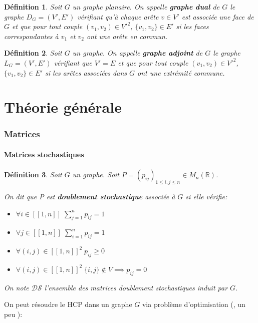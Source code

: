 \documentclass{article}
\newtheorem{definition}{Définition}[section]
\begin{document}
\begin{definition}
Soit $G$ un graphe planaire. On appelle \textbf{graphe dual} de $G$ le graphe $D_{G}=(V',E')$ vérifiant qu'à chaque arête $v \in V'$ est associée une face de $G$ et que pour tout couple $(v_{1},v_{2}) \in V'^{2}$, $\{v_{1},v_{2}\} \in E'$ si les faces correspondantes à $v_{1}$ et $v_{2}$ ont une arête en commun.
\end{definition}

\begin{definition}
Soit $G$ un graphe. On appelle \textbf{graphe adjoint} de $G$ le graphe $L_{G}=(V',E')$ vérifiant que $V'=E$ et que pour tout couple $(v_{1},v_{2}) \in V'^{2}$, $\{v_{1},v_{2}\} \in E'$ si les arêtes associées dans $G$ ont une extrémité commune.
\end{definition}


\part{Théorie générale}

\section{Matrices}
\subsection{Matrices stochastiques}

\begin{definition}
Soit $G$ un graphe.
Soit $P=(p_{ij})_{1 \le i,j \le n} \in M_{n}(\mathbb{R})$.

On dit que P est \textbf{doublement stochastique} associée à $G$ si elle vérifie:

\begin{itemize}
\item $\forall i \in [\![1,n]\!] \; \sum\limits_{j=1}^{n}p_{ij}=1$
\item  $\forall j \in [\![1,n]\!] \; \sum\limits_{i=1}^{n}p_{ij}=1$
\item $\forall (i,j) \in [\![1,n]\!]^2 \; p_{ij} \ge 0$
\item  $\forall (i,j) \in [\![1,n]\!]^2 \; \{i,j\} \notin V \implies p_{ij}=0$
\end{itemize}

On note $\mathcal{D}\mathcal{S}$ l'ensemble des matrices doublement stochastiques induit par $G$.
\end{definition}

On peut résoudre le HCP dans un graphe $G$  via problème d'optimisation (\cite{Haythorpe2010FindingHC,Ejov2008DeterminantsAL}, un peu \cite{Ejov2009ConsistentBO}):
\end{document}
